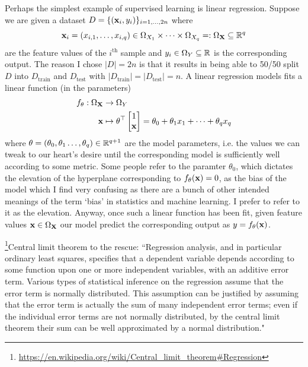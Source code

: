 \documentclass[11pt]{article}
\begin{document}
Perhaps the simplest example of supervised learning is linear regression. Suppose we are given a dataset $D=\{(\mathbf{x}_i,y_i)\}_{i=1,\dots,2n}$ where
$$
\mathbf{x}_i=(x_{i,1},\dots,x_{i, q})\in \Omega_{X_1}\times\dots\times \Omega_{X_q}=:\Omega_{\mathbf{X}}\subseteq\mathbb{R}^q
$$
are the feature values of the $i^{\text{th}}$ sample and $y_i\in \Omega_{Y}\subseteq\mathbb{R}$ is the corresponding output. The reason I chose $|D|=2n$ is that it results in being able to 50/50 split $D$ into $D_{\text{train}}$ and $D_{\text{test}}$ with $|D_{\text{train}}|=|D_{\text{test}}|=n$. A linear regression models fits a linear function (in the parameters)
\begin{align*}
    f_{\theta}:\Omega_{\mathbf{X}}&\rightarrow \Omega_Y\\
    \mathbf{x}&\mapsto
    \theta^{\top}
    \begin{bmatrix}
        1\\
        \mathbf{x}
    \end{bmatrix}
    =
    \theta_0+\theta_1x_1+\dots+\theta_qx_q    
\end{align*}
where $\theta=(\theta_0,\theta_1\dots,\theta_q)\in\mathbb{R}^{q+1}$ are the model parameters, i.e. the values we can tweak to our heart's desire until the corresponding model is sufficiently well according to some metric. Some people refer to the paramter $\theta_0$, which dictates the elevation of the hyperplane corresponding to $f_{\theta}(\mathbf{x})=0$, as the bias of the model which I find very confusing as there are a bunch of other intended meanings of the term `bias' in statistics and machine learning. I prefer to refer to it as the elevation. Anyway, once such a linear function has been fit, given feature values $\mathbf{x}\in\Omega_{\mathbf{X}}$ our model predict the corresponding output as $y=f_{\theta}(\mathbf{x})$.

\begin{tcolorbox}[title={\centering\textbf{Are residuals really normally distributed?}}, colback=myLightBlue, colbacktitle=myDarkBlue, colframe=myDarkBlue, coltitle=white]
    \footnote{\url{https://en.wikipedia.org/wiki/Central\_limit\_theorem\#Regression}}Central limit theorem to the rescue: ``Regression analysis, and in particular ordinary least squares, specifies that a dependent variable depends according to some function upon one or more independent variables, with an additive error term. Various types of statistical inference on the regression assume that the error term is normally distributed. This assumption can be justified by assuming that the error term is actually the sum of many independent error terms; even if the individual error terms are not normally distributed, by the central limit theorem their sum can be well approximated by a normal distribution."
\end{tcolorbox}
\end{document}
